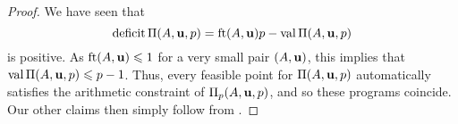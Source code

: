 \documentclass[11pt]{amsart}
\newcommand{\short}{\operatorname{short}}
\newcommand{\ushort}{\operatorname{ushort}}
\newcommand{\deficit}{\operatorname{deficit}}
\newcommand{\udeficit}{\operatorname{udeficit}}
\begin{document}
\begin{proof}
   We have seen that
   \[ \deficit \IP(A, \vv{u}, p)  = \ft{A}{\vv{u}} p -\val \IP(A, \vv{u}, p)\]
   is positive. 
   As $\operatorname{ft}(A, \mathbf{u}) \leqslant 1$ for a very small pair $(A,\mathbf{u})$, this implies that $\operatorname{val}\Pi(A,\mathbf{u},p)\leqslant p-1$.
   Thus, every feasible point for $\Pi(A, \mathbf{u}, p)$ automatically satisfies the arithmetic constraint of $\Pi_p(A, \mathbf{u}, p)$, and so these programs coincide.
   Our other claims then simply follow from .
\end{proof}


\end{document}
